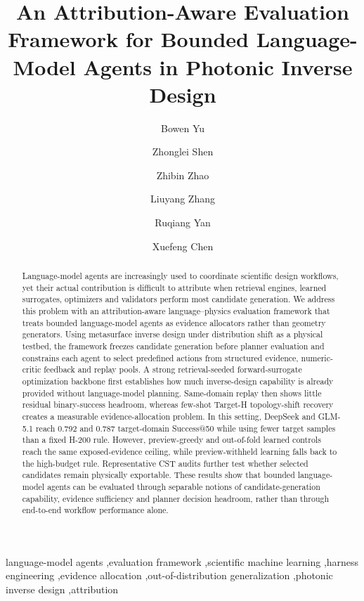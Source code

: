 \documentclass[final,1p,times]{elsarticle}
\begin{document}
		
\begin{frontmatter}

\title{An Attribution-Aware Evaluation Framework for Bounded Language-Model Agents in Photonic Inverse Design}

\author[add1]{Bowen Yu}
\author[add1]{Zhonglei Shen}
\author[add1]{Zhibin Zhao}
\author[add1]{Liuyang Zhang}
\author[add1]{Ruqiang Yan}
\author[add1]{Xuefeng Chen}


\address[add1]{School of Mechanical Engineering, Xi'an Jiaotong University, Xi'an, Shaanxi, 710049, China.}

\begin{abstract}
Language-model agents are increasingly used to coordinate scientific design workflows, yet their actual contribution is difficult to attribute when retrieval engines, learned surrogates, optimizers and validators perform most candidate generation. We address this problem with an attribution-aware language--physics evaluation framework that treats bounded language-model agents as evidence allocators rather than geometry generators. Using metasurface inverse design under distribution shift as a physical testbed, the framework freezes candidate generation before planner evaluation and constrains each agent to select predefined actions from structured evidence, numeric-critic feedback and replay pools. A strong retrieval-seeded forward-surrogate optimization backbone first establishes how much inverse-design capability is already provided without language-model planning. Same-domain replay then shows little residual binary-success headroom, whereas few-shot Target-H topology-shift recovery creates a measurable evidence-allocation problem. In this setting, DeepSeek and GLM-5.1 reach 0.792 and 0.787 target-domain Success@50 while using fewer target samples than a fixed H-200 rule. However, preview-greedy and out-of-fold learned controls reach the same exposed-evidence ceiling, while preview-withheld learning falls back to the high-budget rule. Representative CST audits further test whether selected candidates remain physically exportable. These results show that bounded language-model agents can be evaluated through separable notions of candidate-generation capability, evidence sufficiency and planner decision headroom, rather than through end-to-end workflow performance alone.
\end{abstract}

\begin{keyword}
language-model agents \sep evaluation framework \sep scientific machine learning \sep harness engineering \sep evidence allocation \sep out-of-distribution generalization \sep photonic inverse design \sep attribution
\end{keyword}

\end{frontmatter}
\end{document}

